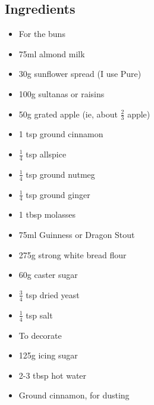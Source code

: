 \documentclass{book}
\begin{document}
\subsection*{Ingredients}
\begin{itemize}
\item For the buns
\item 75ml almond milk
\item 30g sunflower spread (I use Pure)
\item 100g sultanas or raisins
\item 50g grated apple (ie, about $\frac{2}{3}$ apple)
\item 1 tsp ground cinnamon
\item $\frac{1}{4}$ tsp allspice
\item $\frac{1}{4}$ tsp ground nutmeg
\item $\frac{1}{4}$ tsp ground ginger
\item 1 tbsp molasses
\item 75ml Guinness or Dragon Stout
\item 275g strong white bread flour
\item 60g caster sugar
\item $\frac{3}{4}$ tsp dried yeast
\item $\frac{1}{4}$ tsp salt
\end{itemize}

\begin{itemize}
\item To decorate
\item 125g icing sugar
\item 2-3 tbsp hot water
\item Ground cinnamon, for dusting
\end{itemize}
\end{document}
